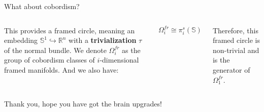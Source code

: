 \documentclass[12pt]{beamer}
\begin{document}
\begin{frame}{What about cobordism?}
\begin{columns}
\pause
{}
This provides a framed circle, meaning an embedding $\mathbb{S}^1 \hookrightarrow \mathbb{R}^n$ with a \textbf{ trivialization } $\tau$ of the normal bundle. We denote $\Omega^{fr}_i$ as the group of cobordism classes of $i$-dimensional framed manifolds. \pause And we also have:

\[
  \Omega^{fr}_i \cong \pi^s_i(\mathbb{S}) 
\]

Therefore, this framed circle is non-trivial and is the generator of $\Omega^{fr}_1$.

\end{columns}
\end{frame}
\begin{frame}{Thank you, hope you have got the brain upgrades!}
  
\begin{figure}
  \begin{center}

\end{center}
\end{figure}
\end{frame}
\end{document}
